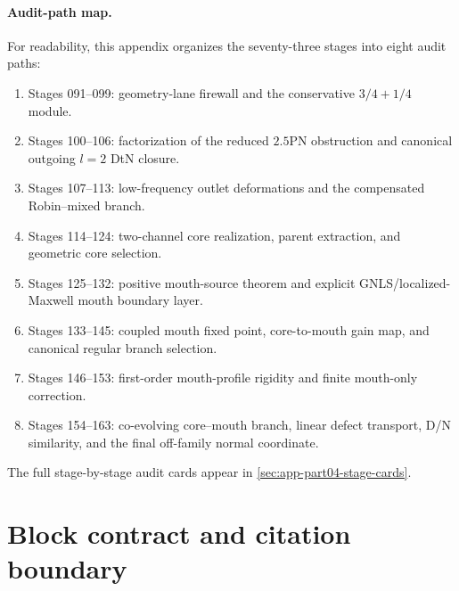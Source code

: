 \paragraph{Audit-path map.}
For readability, this appendix organizes the seventy-three stages into eight audit paths:
\begin{enumerate}[leftmargin=2.2em]
\item Stages 091--099: geometry-lane firewall and the conservative \(3/4+1/4\) module.
\item Stages 100--106: factorization of the reduced \(2.5\)PN obstruction and canonical outgoing \(l=2\) DtN closure.
\item Stages 107--113: low-frequency outlet deformations and the compensated Robin--mixed branch.
\item Stages 114--124: two-channel core realization, parent extraction, and geometric core selection.
\item Stages 125--132: positive mouth-source theorem and explicit GNLS/localized-Maxwell mouth boundary layer.
\item Stages 133--145: coupled mouth fixed point, core-to-mouth gain map, and canonical regular branch selection.
\item Stages 146--153: first-order mouth-profile rigidity and finite mouth-only correction.
\item Stages 154--163: co-evolving core--mouth branch, linear defect transport, D/N similarity, and the final off-family normal coordinate.
\end{enumerate}
The full stage-by-stage audit cards appear in \cref{sec:app-part04-stage-cards}.



\section{Block contract and citation boundary}
\label{sec:app-part04-block-contract}

